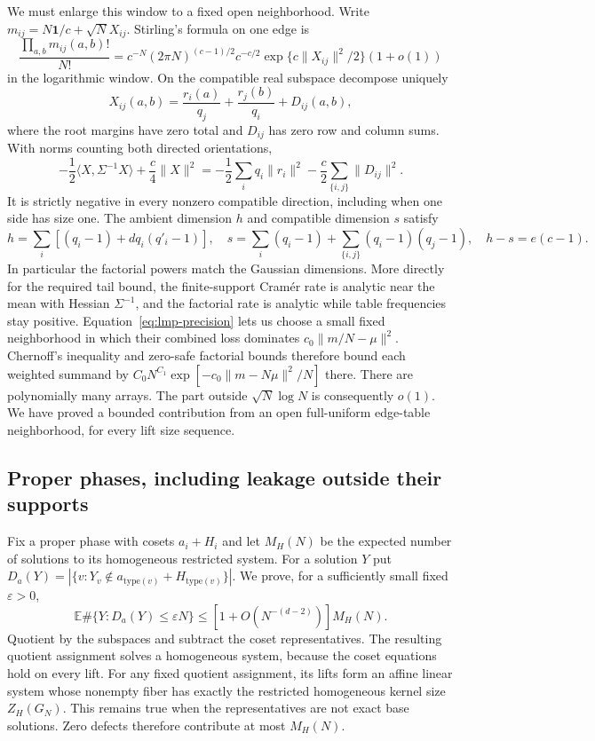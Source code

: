 We must enlarge this window to a fixed open neighborhood. Write
$m_{ij}=N\mathbf1/c+\sqrt N X_{ij}$. Stirling's formula on one edge is
\[
 \frac{\prod_{a,b}m_{ij}(a,b)!}{N!}
 =c^{-N}(2\pi N)^{(c-1)/2}c^{-c/2}
       \exp\{c\|X_{ij}\|^2/2\}(1+o(1))
\]
in the logarithmic window. On the compatible real subspace decompose
uniquely
\[
 X_{ij}(a,b)=\frac{r_i(a)}{q_j}+\frac{r_j(b)}{q_i}+D_{ij}(a,b),
\]
where the root margins have zero total and $D_{ij}$ has zero row and
column sums. With norms counting both directed orientations,
\begin{equation}\label{eq:lmp-precision}
 -\frac12\langle X,\Sigma^{-1}X\rangle+\frac c4\|X\|^2
 =-\frac12\sum_iq_i\|r_i\|^2
                   -\frac c2\sum_{\{i,j\}}\|D_{ij}\|^2.
\end{equation}
It is strictly negative in every nonzero compatible direction,
including when one side has size one. The ambient dimension $h$ and
compatible dimension $s$ satisfy
\[
 h=\sum_i[(q_i-1)+dq_i(q'_i-1)],\quad
 s=\sum_i(q_i-1)+\sum_{\{i,j\}}(q_i-1)(q_j-1),\quad
 h-s=e(c-1).
\]
In particular the factorial powers match the Gaussian dimensions.
More directly for the required tail bound, the finite-support
Cram\'er rate is analytic near the mean with Hessian $\Sigma^{-1}$,
and the factorial rate is analytic while table frequencies stay
positive. Equation~\eqref{eq:lmp-precision} lets us choose a small
fixed neighborhood in which their combined loss dominates
$c_0\|m/N-\mu\|^2$. Chernoff's inequality and zero-safe factorial
bounds therefore bound each weighted summand by
$C_0N^{C_1}\exp[-c_0\|m-N\mu\|^2/N]$ there. There are polynomially
many arrays. The part outside $\sqrt N\log N$ is consequently $o(1)$.
We have proved a bounded contribution from an open full-uniform
edge-table neighborhood, for every lift size sequence.

\subsection{Proper phases, including leakage outside their supports}
Fix a proper phase with cosets $a_i+H_i$ and let $M_H(N)$ be the
expected number of solutions to its homogeneous restricted system.
For a solution $Y$ put
$D_a(Y)=|\{v:Y_v\notin a_{\mathrm{type}(v)}+H_{\mathrm{type}(v)}\}|$.
We prove, for a sufficiently small fixed $\varepsilon>0$,
\begin{equation}\label{eq:lmp-boundary}
 \mathbb E\#\{Y:D_a(Y)\le\varepsilon N\}
       \le[1+O(N^{-(d-2)})]M_H(N).
\end{equation}
Quotient by the subspaces and subtract the coset representatives.
The resulting quotient assignment solves a homogeneous system,
because the coset equations hold on every lift. For any fixed
quotient assignment, its lifts form an affine linear system whose
nonempty fiber has exactly the restricted homogeneous kernel size
$Z_H(G_N)$. This remains true when the representatives are not exact
base solutions. Zero defects therefore contribute at most $M_H(N)$.

